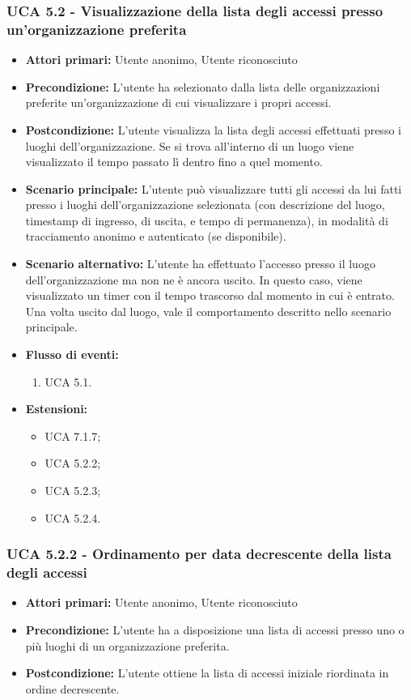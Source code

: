 \subsubsection{UCA 5.2 - Visualizzazione della lista degli accessi presso un'organizzazione preferita}
\begin{itemize}
    \item \textbf{Attori primari:} Utente anonimo, Utente riconosciuto
    \item \textbf{Precondizione:} L'utente ha selezionato dalla lista delle organizzazioni preferite un'organizzazione di cui visualizzare i propri accessi.
    \item \textbf{Postcondizione:} L'utente visualizza la lista degli accessi effettuati presso i luoghi dell'organizzazione. Se si trova all'interno di un luogo viene visualizzato il tempo passato lì dentro fino a quel momento.
    \item \textbf{Scenario principale:} L'utente può visualizzare tutti gli accessi da lui fatti presso i luoghi dell'organizzazione selezionata (con descrizione del luogo, timestamp di ingresso, di uscita, e tempo di permanenza), in modalità di tracciamento anonimo e autenticato (se disponibile).
    \item \textbf{Scenario alternativo:} L'utente ha effettuato l'accesso presso il luogo dell'organizzazione ma non ne è ancora uscito. In questo caso, viene visualizzato un timer con il tempo trascorso dal momento in cui è entrato.
    Una volta uscito dal luogo, vale il comportamento descritto nello scenario principale.
    \item \textbf{Flusso di eventi:}
    \begin{enumerate}
        \item UCA 5.1.
    \end{enumerate}
    \item \textbf{Estensioni:}
    \begin{itemize}
        \item UCA 7.1.7;
        \item UCA 5.2.2;
        \item UCA 5.2.3;
        \item UCA 5.2.4.
    \end{itemize}
\end{itemize}

\subsubsection{UCA 5.2.2 - Ordinamento per data decrescente della lista degli accessi}
\begin{itemize}
    \item \textbf{Attori primari:} Utente anonimo, Utente riconosciuto
    \item \textbf{Precondizione:} L'utente ha a disposizione una lista di accessi presso uno o più luoghi di un organizzazione preferita.
    \item \textbf{Postcondizione:} L'utente ottiene la lista di accessi iniziale riordinata in ordine decrescente.
\end{itemize}


